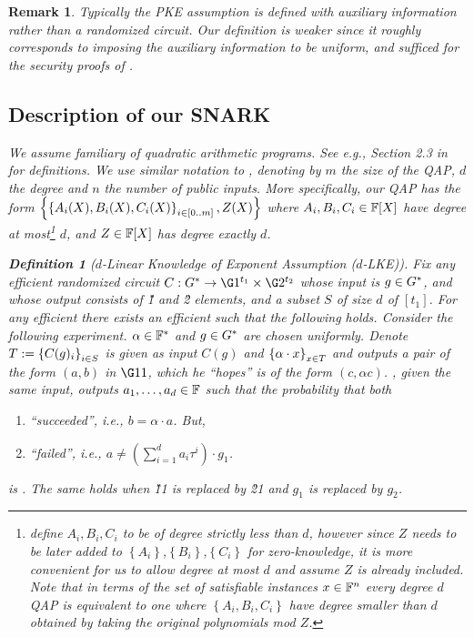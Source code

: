 \documentclass[11pt]{article}
\numberwithin{figure}{section} %
\newtheorem{dfn}[thm]{Definition}
\newtheorem{remark}[thm]{Remark}
\newcommand{\set}[1]{\ensuremath{\left\{#1\right\}}\xspace}
\begin{document}
\begin{remark}
Typically the PKE assumption is defined with auxiliary information rather than a randomized circuit.
Our definition is weaker since it roughly corresponds to imposing the auxiliary information to be uniform,
and sufficed for the security proofs of \cite{GGPR,PHGR}.
\subsection{Description of our SNARK}\label{subsec:SNARK}
We assume familiary of quadratic arithmetic programs.
See e.g., Section 2.3 in \cite{groth16} for definitions.
We use similar notation to \cite{BCTV}, denoting by $m$ the size of the QAP, $d$ the degree and $n$ the number of public inputs.
More specifically, our QAP has the form \set{\sett{A_i(X),B_i(X),C_i(X)}{i\in [0..m]}, Z(X)}
where $A_i,B_i,C_i\in \mathbb F[X]$ have degree at most\footnote{\cite{BCTV} define $A_i,B_i,C_i$ to be of degree strictly less than $d$, however since $Z$ needs to be later added to \set{A_i},\set{B_i},\set{C_i} for zero-knowledge, it is more convenient for us to allow degree at most $d$ and assume $Z$ is already included. Note that in terms of the set of satisfiable instances $x\in \mathbb F^n$ every degree $d$ QAP is equivalent to one where \set{A_i,B_i,C_i} have degree smaller than $d$ obtained by taking the original polynomials mod $Z$.} $d$, and $Z\in \mathbb F[X]$ has degree exactly $d$.



\begin{dfn}[$d$-Linear Knowledge of Exponent Assumption ($d$-LKE)]\label{dfn:koeassumption}
Fix any efficient randomized circuit $C:\grouppair \to \G1^{t_1}\times \G2^{t_2}$ whose input is $g\in G^*$, and whose output consists of \G1 and \G2 elements, and a subset $S$ of size $d$ of $[t_1]$.
For any efficient \adv there exists an efficient \ext such that the following holds.
Consider the following experiment.
 $\alpha\in \mathbb F^*$ and $g\in G^*$ are chosen uniformly.
 Denote $T\defeq \sett{C(g)_i}{i\in S}$
 \adv is given as input $C(g)$ and $\sett{\alpha\cdot x }{x\in T}$
 and outputs a pair of the form $(a,b)$ in $\G11$, which he ``hopes'' is of the form $(c,\alpha c)$.
   \ext, given the same input, outputs  
 $a_1,\ldots,a_d \in \mathbb F$ such that the probability that both
   
 \begin{enumerate}
  \item \adv ``succeeded'', i.e., $b=\alpha\cdot a$. But,
  \item \ext ``failed'', i.e., $a \neq (\sum_{i=1}^d a_i \tau^i)\cdot g_1$.
   \end{enumerate}
is \neg.
 The same holds when \G11 is replaced by \G21 and $g_1$ is replaced by $g_2$.
\end{dfn}



\end{remark}
\end{document}
